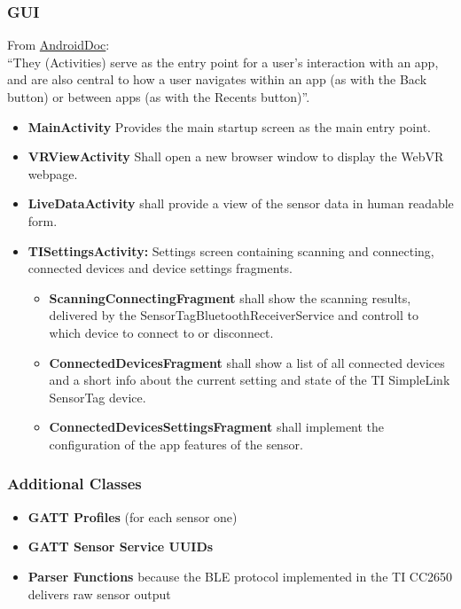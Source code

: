\subsubsection{GUI}
From \href{https://developer.android.com/guide/components/services.html}{AndroidDoc}: \\
``They (Activities) serve as the entry point for a user's interaction with an app, and are also central to how a user navigates within an app (as with the Back button) or between apps (as with the Recents button)''. \newline
\begin{itemize}
  \item \textbf{MainActivity} Provides the main startup screen as the main entry point.
  \item \textbf{VRViewActivity} Shall open a new browser window to display the WebVR webpage.
  \item \textbf{LiveDataActivity} shall provide a view of the sensor data in human readable form.
  \item \textbf{TISettingsActivity:} Settings screen containing scanning and connecting, connected devices and device settings fragments.
  \begin{itemize}
    \item \textbf{ScanningConnectingFragment} shall show the scanning results, delivered by the SensorTagBluetoothReceiverService and controll to which device to connect to or disconnect.
    \item \textbf{ConnectedDevicesFragment} shall show a list of all connected devices and a short info about the current setting and state of the TI SimpleLink SensorTag device.
    \item \textbf{ConnectedDevicesSettingsFragment} shall implement the configuration of the app features of the sensor.
  \end{itemize}
\end{itemize}

\subsubsection{Additional Classes}
\begin{itemize}
  \item \textbf{GATT Profiles} (for each sensor one)
  \item \textbf{GATT Sensor Service UUIDs}
  \item \textbf{Parser Functions} because the BLE protocol implemented in the TI CC2650 delivers raw sensor output
\end{itemize}
